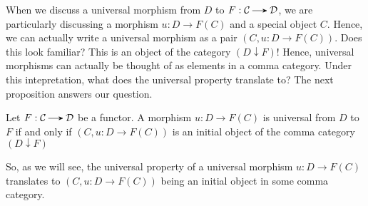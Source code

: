     When we discuss a universal morphism from $D$ to $F: \cc \to \dd$, 
    we are particularly discussing a morphism 
    $u: D \to F(C)$ and a special object $C$. Hence, we can actually write 
    a universal morphism as a pair $(C, u: D \to F(C))$. Does this look familiar? 
    This is an object of the category $(D \downarrow F)$! 
    Hence, universal morphisms can actually be thought of as elements in a comma category. 
    Under this intepretation, what does the universal property translate to?
    The next proposition answers our question. 

    \begin{proposition}
        Let $F:\cc \to \dd$ be a functor. A morphism $u: D \to F(C)$ is universal 
        from $D$ to $F$ if and only if $(C, u:D \to F(C))$ is an initial object of the 
        comma category $(D \downarrow F)$ 
    \end{proposition}

    So, as we will see, the universal property of a universal morphism $u: D \to F(C)$
    translates to $(C, u: D \to F(C))$ being an initial object in some comma category.

